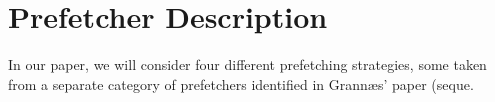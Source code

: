
\section{Prefetcher Description}
\label{sec:prefetcherDescription}

In our paper, we will consider four different prefetching strategies,
some taken from a separate category of prefetchers identified in
Grannæs' paper (seque. \cite{Grannas}





